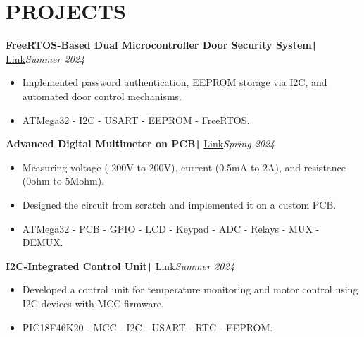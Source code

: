 \documentclass[11pt,a4paper]{article}
\begin{document}
\section*{\fontsize{14}{18}\textbf\selectfont PROJECTS}
\vspace{-0.3cm}
\begin{flushleft}
\textbf{FreeRTOS-Based Dual Microcontroller Door Security System}\texttt{|} {\href{https://www.linkedin.com/feed/update/urn:li:activity:7261751302018244608/}{Link}}\hfill\textit{Summer 2024}\\
\end{flushleft}
\vspace{-0.6cm}
\begin{itemize}
\item \setlength{\itemsep}{-0.0em} Implemented password authentication, EEPROM storage via I2C, and automated door control mechanisms.
\item \setlength{\itemsep}{-0.0em} ATMega32 - I2C - USART - EEPROM - FreeRTOS.
\end{itemize}
\vspace{-0.3cm}
\begin{flushleft}
\textbf{Advanced Digital Multimeter on PCB}\texttt{|} {\href{https://www.linkedin.com/feed/update/urn:li:activity:7227981461818138624/}{Link}}\hfill\textit{Spring 2024}\\
\end{flushleft}
\vspace{-0.6cm}
\begin{itemize}
\item \setlength{\itemsep}{-0.0em} Measuring voltage (-200V to 200V), current (0.5mA to 2A), and resistance (0ohm to 5Mohm).
\item \setlength{\itemsep}{-0.0em} Designed the circuit from scratch and implemented it on a custom PCB.
\item \setlength{\itemsep}{-0.0em} ATMega32 - PCB - GPIO - LCD - Keypad - ADC - Relays - MUX - DEMUX.
\end{itemize}
\vspace{-0.3cm}
\begin{flushleft}
\textbf{I2C-Integrated Control Unit}\texttt{|} {\href{https://www.linkedin.com/feed/update/urn:li:activity:7243602012020330497/}{Link}}\hfill\textit{Summer 2024}\\
\end{flushleft}
\vspace{-0.6cm}
\begin{itemize}
\item \setlength{\itemsep}{-0.0em} Developed a control unit for temperature monitoring and motor control using I2C devices with MCC firmware.
\item \setlength{\itemsep}{-0.0em} PIC18F46K20 - MCC - I2C - USART - RTC - EEPROM.
\end{itemize}
\end{document}
